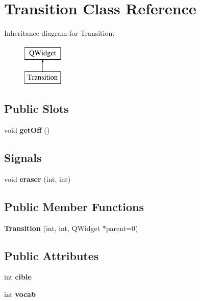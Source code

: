 \hypertarget{class_transition}{\section{Transition Class Reference}
\label{class_transition}
}
Inheritance diagram for Transition\-:\begin{figure}[H]
\begin{center}
\leavevmode
\includegraphics[height=2.000000cm]{class_transition}
\end{center}
\end{figure}
\subsection*{Public Slots}
\begin{DoxyCompactItemize}
\item 
\hypertarget{class_transition_a74d10ea64197661946db6d02b35b4cf1}{void {\bfseries get\-Off} ()}\label{class_transition_a74d10ea64197661946db6d02b35b4cf1}

\end{DoxyCompactItemize}
\subsection*{Signals}
\begin{DoxyCompactItemize}
\item 
\hypertarget{class_transition_abbd3e6ff526c19cd4ebc629d1be10200}{void {\bfseries eraser} (int, int)}\label{class_transition_abbd3e6ff526c19cd4ebc629d1be10200}

\end{DoxyCompactItemize}
\subsection*{Public Member Functions}
\begin{DoxyCompactItemize}
\item 
\hypertarget{class_transition_a42b17d24af24110d405ce53c1956cc2e}{{\bfseries Transition} (int, int, Q\-Widget $\ast$parent=0)}\label{class_transition_a42b17d24af24110d405ce53c1956cc2e}

\end{DoxyCompactItemize}
\subsection*{Public Attributes}
\begin{DoxyCompactItemize}
\item 
\hypertarget{class_transition_a1b3f80305749c8f032a7f711527b0fc3}{int {\bfseries cible}}\label{class_transition_a1b3f80305749c8f032a7f711527b0fc3}

\item 
\hypertarget{class_transition_a209c68fd432cd8e763342c1f2c784a87}{int {\bfseries vocab}}\label{class_transition_a209c68fd432cd8e763342c1f2c784a87}

\end{DoxyCompactItemize}
